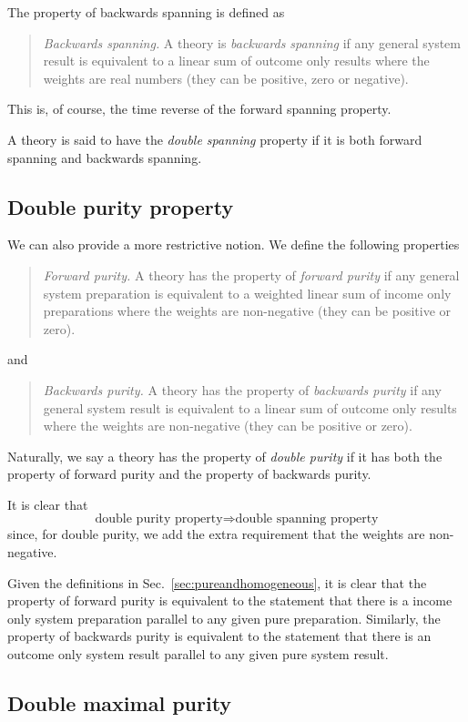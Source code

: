 \documentclass[10pt]{article}
\begin{document}
The property of backwards spanning is defined as
\begin{quote}
\emph{Backwards spanning.}  A theory is \emph{backwards spanning} if any general system result is equivalent to a linear sum of outcome only results where the weights are real numbers (they can be positive, zero or negative).
\end{quote}
This is, of course, the time reverse of the forward spanning property.

A theory is said to have the \emph{double spanning} property if it is both forward spanning and backwards spanning.


\subsection{Double purity property}\label{sec:doublepurity}

We can also provide a more restrictive notion.   We define the following properties
\begin{quote}
\emph{Forward purity.}   A theory has the property of \emph{forward purity} if any general system preparation is equivalent to a weighted linear sum of income only preparations where the weights are non-negative (they can be positive or zero).
\end{quote}
and
\begin{quote}
\emph{Backwards purity.}  A theory has the property of \emph{backwards purity} if any general system result is equivalent to a linear sum of outcome only results where the weights are non-negative (they can be positive or zero).
\end{quote}
Naturally, we say a theory has the property of \emph{double purity} if it has both the property of forward purity and the property of backwards purity.

It is clear that
\[ \text{double purity property} \Longrightarrow \text{double spanning property}    \]
since, for double purity, we add the extra requirement that the weights are non-negative.

Given the definitions in Sec.\ \ref{sec:pureandhomogeneous}, it is clear that the property of forward purity is equivalent to the statement that there is a income only system preparation parallel to any given pure preparation.  Similarly, the property of backwards purity is equivalent to the statement that there is an outcome only system result parallel to any given pure system result.


\subsection{Double maximal purity}
\end{document}
